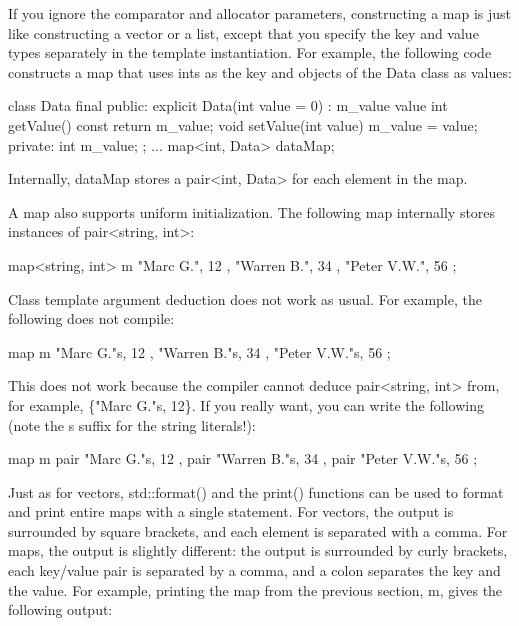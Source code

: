 If you ignore the comparator and allocator parameters, constructing a map is just like constructing a vector or a list, except that you specify the key and value types separately in the template instantiation. For example, the following code constructs a map that uses ints as the key and objects of the Data class as values:

\begin{cpp}
class Data final
{
    public:
        explicit Data(int value = 0) : m_value { value } { }
        int getValue() const { return m_value; }
        void setValue(int value) { m_value = value; }
    private:
        int m_value;
};
...
map<int, Data> dataMap;
\end{cpp}

Internally, dataMap stores a pair<int, Data> for each element in the map.

A map also supports uniform initialization. The following map internally stores instances of pair<string, int>:

\begin{cpp}
map<string, int> m {
    { "Marc G.", 12 }, { "Warren B.", 34 }, { "Peter V.W.", 56 }
};
\end{cpp}

Class template argument deduction does not work as usual. For example, the following does not compile:

\begin{cpp}
map m {
    { "Marc G."s, 12 }, { "Warren B."s, 34 }, { "Peter V.W."s, 56 }
};
\end{cpp}

This does not work because the compiler cannot deduce pair<string, int> from, for example, \{"Marc G."s, 12\}. If you really want, you can write the following (note the s suffix for the string literals!):

\begin{cpp}
map m {
    pair { "Marc G."s, 12 }, pair { "Warren B."s, 34 }, pair { "Peter V.W."s, 56 }
};
\end{cpp}



Just as for vectors, std::format() and the print() functions can be used to format and print entire maps with a single statement. For vectors, the output is surrounded by square brackets, and each element is separated with a comma. For maps, the output is slightly different: the output is surrounded by curly brackets, each key/value pair is separated by a comma, and a colon separates the key and the value. For example, printing the map from the previous section, m, gives the following output:

